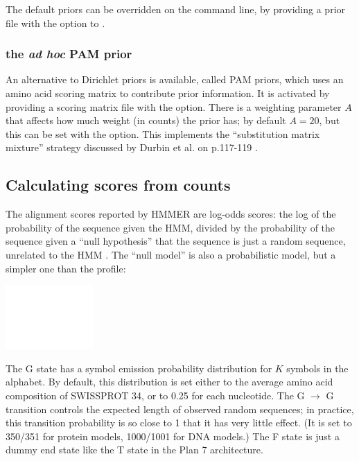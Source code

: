 The default priors can be overridden on the command line, by providing
a prior file with the  option to .

\subsubsection{the \emph{ad hoc} PAM prior}

An alternative to Dirichlet priors is available, called PAM priors,
which uses an amino acid scoring matrix to contribute prior
information.  It is activated by providing a scoring matrix file with
the  option. There is a weighting parameter $A$ that
affects how much weight (in counts) the prior has; by default $A=20$,
but this can be set with the  option. This
implements the ``substitution matrix mixture'' strategy discussed by
Durbin et al. on p.117-119 \citep{Durbin98}.

\subsection{Calculating scores from counts}

The alignment scores reported by HMMER are log-odds scores: the log of
the probability of the sequence given the HMM, divided by the
probability of the sequence given a ``null hypothesis'' that the
sequence is just a random sequence, unrelated to the HMM
\citep{Barrett97}. The ``null model'' is also a probabilistic model,
but a simpler one than the profile:

\begin{center}
\includegraphics{nullmodel}
\end{center}

The G state has a symbol emission probability distribution for $K$
symbols in the alphabet. By default, this distribution is set either
to the average amino acid composition of SWISSPROT 34, or to 0.25 for
each nucleotide. The G $\rightarrow$ G transition controls the
expected length of observed random sequences; in practice, this
transition probability is so close to 1 that it has very little
effect. (It is set to 350/351 for protein models, 1000/1001 for DNA
models.) The F state is just a dummy end state like the T state in the
Plan 7 architecture.

